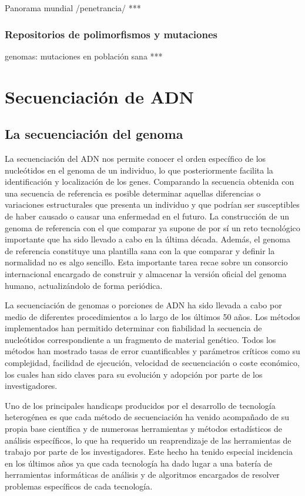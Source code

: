 \medskip
Panorama mundial /penetrancia/ ***

\subsubsection{Repositorios de polimorfismos y mutaciones}

 genomas: mutaciones en población sana ***

\section{Secuenciación de ADN}

\subsection{La secuenciación del genoma}

La secuenciación del ADN nos permite conocer el orden específico de los nucleótidos en el genoma de un individuo, lo que posteriormente facilita la identificación y localización de los genes. Comparando la secuencia obtenida con una secuencia de referencia es posible determinar aquellas diferencias o variaciones estructurales que presenta un individuo y que podrían ser susceptibles de haber causado o causar una enfermedad en el futuro. La construcción de un genoma de referencia con el que comparar ya supone de por sí un reto tecnológico importante que ha sido llevado a cabo en la última década. Además, el genoma de referencia constituye una plantilla sana con la que comparar y definir la normalidad no es algo sencillo. Esta importante tarea recae sobre un consorcio internacional \cite{GRC} encargado de construir y almacenar la versión oficial del genoma humano, actualizándolo de forma periódica.

\medskip
La secuenciación de genomas o porciones de ADN ha sido llevada a cabo por medio de diferentes procedimientos a lo largo de los últimos 50 años. Los métodos implementados han permitido determinar con fiabilidad la secuencia de nucleótidos correspondiente a un fragmento de material genético. Todos los métodos han mostrado tasas de error cuantificables y parámetros críticos como su complejidad, facilidad de ejecución, velocidad de secuenciación o coste económico, los cuales han sido claves para su evolución y adopción por parte de los investigadores. 

\medskip
Uno de los principales handicaps producidos por el desarrollo de tecnología heterogénea es que cada método de secuenciación ha venido acompañado de su propia base científica y de numerosas herramientas y métodos estadísticos de análisis específicos, lo que ha requerido un reaprendizaje de las herramientas de trabajo por parte de los investigadores. Este hecho ha tenido especial incidencia en los últimos años ya que cada tecnología ha dado lugar a una batería de herramientas informáticas de análisis y de algoritmos encargados de resolver problemas específicos de cada tecnología. 

